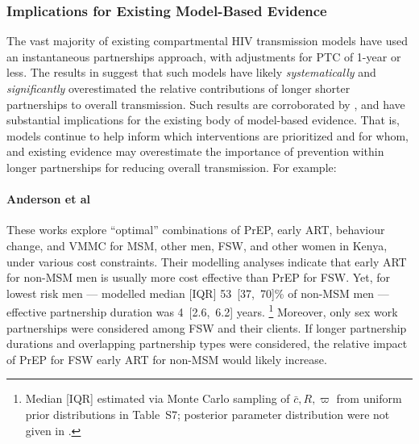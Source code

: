\subsubsection{Implications for Existing Model-Based Evidence}\label{foi.disc.bip.evid}
The vast majority of existing compartmental HIV transmission models
have used an instantaneous partnerships approach,
with adjustments for PTC of 1-year or less.
The results in  suggest that such models
have likely \emph{systematically} and \emph{significantly} overestimated
the relative contributions of longer \vs shorter partnerships to overall transmission.
Such results are corroborated by \cite{Johnson2016mf},
and have substantial implications for the existing body of model-based evidence.
That is, models continue to help inform which interventions are prioritized and for whom,
and existing evidence may overestimate the importance of prevention within longer partnerships
for reducing overall transmission. For example:
\paragraph{Anderson et al}\cite{Anderson2014,Anderson2017,Anderson2018}
These works explore ``optimal'' combinations of PrEP, early ART, behaviour change, and VMMC
for MSM, other men, FSW, and other women in Kenya, under various cost constraints.
Their modelling analyses indicate that
early ART for non-MSM men is usually more cost effective than PrEP for FSW.
Yet, for lowest risk men --- modelled median [IQR] 53~[37,~70]\% of non-MSM men ---
effective partnership duration was 4~[2.6,~6.2] years.%
\footnote{Median [IQR] estimated via Monte Carlo sampling of $\bar{c}, R, \varpi$
  from uniform prior distributions in Table~S7;
  posterior parameter distribution were not given in \cite{Anderson2014}.}
Moreover, only sex work partnerships were considered among FSW and their clients.
If longer partnership durations and overlapping partnership types were considered,
the relative impact of PrEP for FSW \vs early ART for non-MSM would likely increase.
